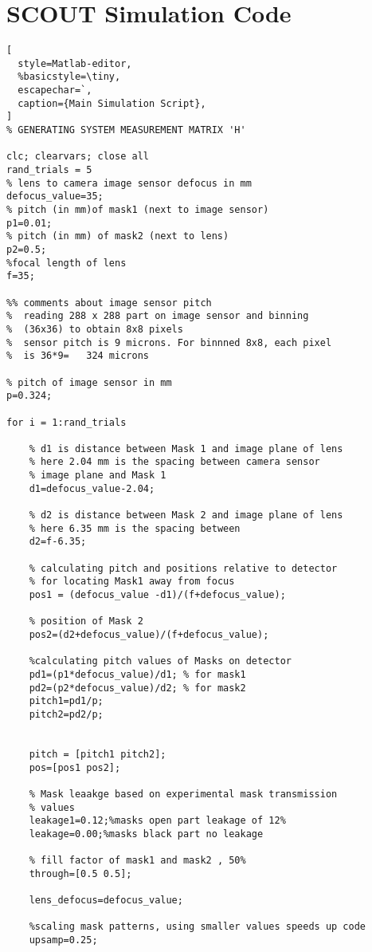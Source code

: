 \chapter{SCOUT Simulation Code}\label{app:scoutSimCode}

\begin{lstlisting}[
  style=Matlab-editor,
  %basicstyle=\tiny,
  escapechar=`,
  caption={Main Simulation Script},
]
% GENERATING SYSTEM MEASUREMENT MATRIX 'H'

clc; clearvars; close all
rand_trials = 5
% lens to camera image sensor defocus in mm
defocus_value=35;
% pitch (in mm)of mask1 (next to image sensor)
p1=0.01; 
% pitch (in mm) of mask2 (next to lens)
p2=0.5;
%focal length of lens
f=35; 

%% comments about image sensor pitch
%  reading 288 x 288 part on image sensor and binning 
%  (36x36) to obtain 8x8 pixels
%  sensor pitch is 9 microns. For binnned 8x8, each pixel
%  is 36*9=   324 microns

% pitch of image sensor in mm
p=0.324;

for i = 1:rand_trials
    
    % d1 is distance between Mask 1 and image plane of lens
    % here 2.04 mm is the spacing between camera sensor
    % image plane and Mask 1
    d1=defocus_value-2.04;
    
    % d2 is distance between Mask 2 and image plane of lens
    % here 6.35 mm is the spacing between
    d2=f-6.35;
    
    % calculating pitch and positions relative to detector
    % for locating Mask1 away from focus
    pos1 = (defocus_value -d1)/(f+defocus_value);
    
    % position of Mask 2
    pos2=(d2+defocus_value)/(f+defocus_value); 
    
    %calculating pitch values of Masks on detector
    pd1=(p1*defocus_value)/d1; % for mask1
    pd2=(p2*defocus_value)/d2; % for mask2
    pitch1=pd1/p;
    pitch2=pd2/p;
    
    
    pitch = [pitch1 pitch2];
    pos=[pos1 pos2];
    
    % Mask leaakge based on experimental mask transmission 
    % values
    leakage1=0.12;%masks open part leakage of 12%
    leakage=0.00;%masks black part no leakage
    
    % fill factor of mask1 and mask2 , 50%
    through=[0.5 0.5]; 
    
    lens_defocus=defocus_value;
    
    %scaling mask patterns, using smaller values speeds up code
    upsamp=0.25; 
    

\end{lstlisting}
